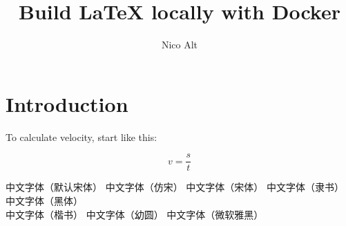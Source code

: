\documentclass[
	english,
	accentcolor=9c,
	type=intern,
	marginpar=false
	]{tudapub}
\begin{document}
\title{Build LaTeX locally with Docker}
\author{Nico Alt}

\maketitle

\section{Introduction}

To calculate velocity, start like this:

\begin{equation*}
v = \frac{s}{t}
\end{equation*}

中文字体（默认宋体）
\fangsong 中文字体（仿宋） \songti 中文字体（宋体） \lishu 中文字体（隶书） \heiti 中文字体（黑体）\\
 中文字体（楷书）  中文字体（幼圆）  中文字体（微软雅黑）\\
\end{document}
